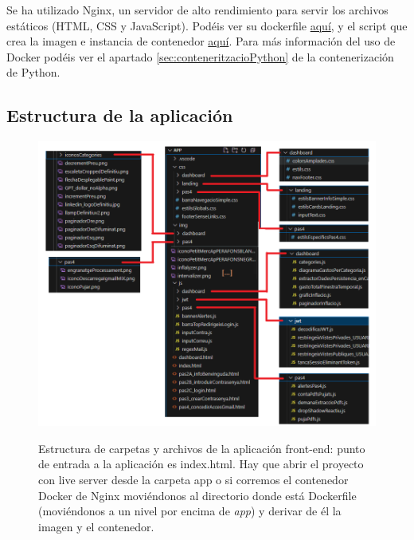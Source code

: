 \documentclass[a4paper,12pt]{report}
\begin{document}
	Se ha utilizado Nginx, un servidor de alto rendimiento para servir los archivos estáticos (HTML, CSS y JavaScript). Podéis ver su dockerfile \href{https://github.com/blackcub3s/mercApp/blob/main/APP%20WEB/__frontend__produccio__/Dockerfile}{aquí}, y el script que crea la imagen e instancia de contenedor \href{https://github.com/blackcub3s/mercApp/blob/main/APP%20WEB/__frontend__produccio__/creaImatge_i_arrancaContenidor.sh}{aquí}. Para más información del uso de Docker podéis ver el apartado \ref{sec:conteneritzacioPython} de la contenerización de Python.
	
	\subsection{Estructura de la aplicación}
	\label{sec:estructuraAplicacionFrontEnd}
	
	\FloatBarrier
	\setlength{\belowcaptionskip}{3pt}
	\begin{figure}[H]
		\centering
		\caption{Estructura de carpetas y archivos de la aplicación front-end: punto de entrada a la aplicación es index.html. Hay que abrir el proyecto con live server desde la carpeta app o si corremos el contenedor Docker de Nginx moviéndonos al directorio donde está Dockerfile (moviéndonos a un nivel por encima de \textit{app}) y derivar de él la imagen y el contenedor.}
		\includegraphics[width=1\linewidth]{img/estructuraAplicacioFront}
		\label{fig:estructuraAplicacioFront}
	\end{figure}
	\FloatBarrier
	
\end{document}

